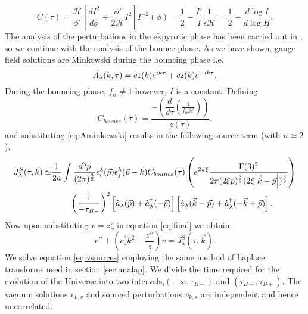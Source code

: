 \documentclass[12pt,a4paper]{article}
\numberwithin{equation}{section}
\numberwithin{equation}{section}
\begin{document}
\begin{equation}
C(\tau)= \frac{\mathcal{H}}{\phi'}\left[\dfrac{dI^2}{d\phi}+ \frac{\phi'}{2\mathcal{H}} I^2 \right] I^{-2}(\phi) =  \frac{1}{2}-\frac{I'}{I} \frac{1}{\epsilon \mathcal{H}} = \frac{1}{2} - \frac{d\log I}{d \log H}. 
\label{eq:C1}
\end{equation}
The analysis of the perturbations in the ekpyrotic phase has been carried out in \cite{r1,r3,Artymowski:2020pci}, so we continue with the analysis of the bounce phase. 
As we have shown, gauge field solutions are Minkowski during the bouncing phase i.e.
\begin{equation} \label{eq:Aminkowski}
     \Tilde{A_{\lambda}}(k,\tau) = c1(k) e^{ik\tau} + c2(k) e^{-ik\tau}.
\end{equation}
During the bouncing phase, $f_{\alpha}\neq1$ however, 
 $I$ is a constant. Defining
\begin{equation}
    C_{bounce}(\tau) = \frac{- \left( \dfrac{d}{d\tau} \left(\frac{1}{{f_{\alpha}\mathcal{H}}} \right)\right) }{z(\tau)}.
    \label{eq:c3}
\end{equation}
and substituting \eqref{eq:Aminkowski} results in the following source term (with $n\simeq 2$), %
\begin{equation}
\begin{split}
    J_{\lambda}^S (\tau,\Vec{k})\simeq & \frac{1}{2 a}\int \frac{d^3p}{(2\pi)^\frac{3}{2}} 
\epsilon_i^{\lambda}(\vec{p})\epsilon_j^{\lambda}(\vec{p}-\vec{k}) C_{bounce}(\tau)  \left( e^{2\pi \xi} \frac{ \Gamma(3)^2}{2\pi  (2 \xi p)^{\frac{3}{2}}(2 \xi \abs{\vec{k}-\vec{p}})^{\frac{3}{2}} } \right) \\
&\;\;\;\;\;\;\;\; \left(\frac{1}{-\tau_{B-}} \right)^2 \left[ \hat{a}_{\lambda}(\vec{p})+\hat{a}^{\dagger}_{\lambda}(-\vec{p})\right]\left[ \hat{a}_{\lambda}(\vec{k}-\vec{p})+\hat{a}^{\dagger}_{\lambda}(-\vec{k}+\vec{p})\right] .
\end{split}
\label{eq:sourceb}
\end{equation}
Now upon substituting $v=z\zeta$ in equation \eqref{eq:final} we obtain
\begin{equation}
    v''+(c_s^2 k^2-\frac{z''}{z}) v =  J_{\lambda}^S (\tau,\Vec{k}).
    \label{eq:vsources}
\end{equation}
We solve equation \eqref{eq:vsources} employing the same method of Laplace transforms used in section \ref{sec:analap}. We divide the time required for the evolution of the Universe into two intervals,$(-\infty,\tau_{B-})$ and $(\tau_{B-},\tau_{B+})$. The vacuum solutions $v_{k,v}$ and sourced perturbations $v_{k,s}$ are independent and hence uncorrelated. 
\end{document}
